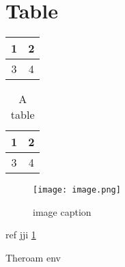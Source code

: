 \documentclass{article}
\begin{document}
    \newpage
    \section{Table}

    \begin{tabular}{|c|c|} %
        \hline 
        1 & 2 \\
        \hline
        3 & 4 \\
        \hline
    \end{tabular}

    \begin{table}
        \caption{A table}
        \begin{center}
            \begin{tabular}{|c|c|} 
                \hline 
                1 & 2 \\
                \hline
                3 & 4 \\
                \hline
            \end{tabular}
        \end{center}
    \end{table}

    \begin{figure}
        \centering
        \texttt{[image: image.png]}
        \caption{image caption}
        \label{image}
    \end{figure}

    ref jji \ref{image}

    \begin{theorem}
        Theroam env 
    \end{theorem}
\end{document}
